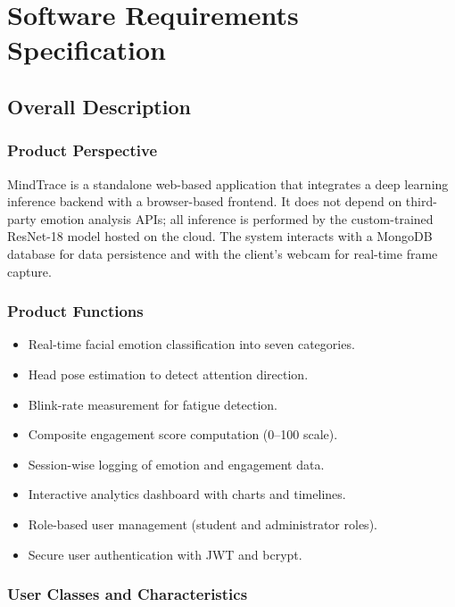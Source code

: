 \chapter{Software Requirements Specification}


\section{Overall Description}

\subsection{Product Perspective}

MindTrace is a standalone web-based application that integrates a deep
learning inference backend with a browser-based frontend. It does not depend
on third-party emotion analysis APIs; all inference is performed by the
custom-trained ResNet-18 model hosted on the cloud. The system interacts with
a MongoDB database for data persistence and with the client's webcam for
real-time frame capture.

\subsection{Product Functions}

\begin{itemize}
    \item Real-time facial emotion classification into seven categories.
    \item Head pose estimation to detect attention direction.
    \item Blink-rate measurement for fatigue detection.
    \item Composite engagement score computation (0--100 scale).
    \item Session-wise logging of emotion and engagement data.
    \item Interactive analytics dashboard with charts and timelines.
    \item Role-based user management (student and administrator roles).
    \item Secure user authentication with JWT and bcrypt.
\end{itemize}

\subsection{User Classes and Characteristics}


